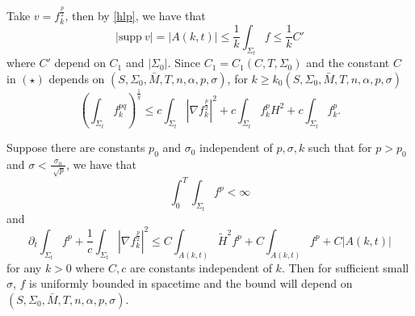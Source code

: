 Take $v=f_{k}^{\frac{p}{2}} $, then by \autoref{hlp}, we have that 
\[\left| \mathrm{supp}  \  v \right|=\left| A(k,t) \right| \leq \frac{1}{k} \int_{\Sigma_t} f \leq \frac{1}{k} C'  \]
where $C'$ depend on $C_1$ and $\left| \Sigma_0 \right| $. Since $C_1=C_1(C,T,\Sigma _0)$ and the constant $C$ in $(\star )$ depends on $(S,\Sigma _0,\bar{M},T,n,\alpha ,p,\sigma )$, for $k \geq k_0(S,\Sigma _0,\bar{M},T,n,\alpha ,p,\sigma ) $
\begin{equation} \label{MSF}
    \left(\int_{\Sigma_t} f_{k}^{pq} \right) ^{\frac{1}{q}} \leq c \int_{\Sigma_t} \left| \nabla f_{k}^{\frac{p}{2}} \right| ^2 + c \int_{\Sigma_t} f_{k}^{p} H^2 + c \int_{\Sigma_t} f_{k}^{p}.
\end{equation}

\begin{theorem}
    Suppose there are constants $p_0$ and $\sigma _0$ independent of $p, \sigma , k$ such that for $p>p_0$ and $\sigma < \frac{\sigma _0}{\sqrt[]{p}}$, we have that 
    \[\int_{0}^{T}\int_{\Sigma_t} f^p < \infty \]
    and
    \begin{equation} \label{ELEFP}
        \partial _t \int_{\Sigma_t} f^p + \frac{1}{c} \int_{\Sigma_t} \left| \nabla f_{k}^{\frac{p}{2}}  \right| ^2 \leq C \int_{A(k,t)}^{} \tilde{H}^2 f^p +C \int_{A(k,t)}^{}f^p + C \left| A(k,t) \right| 
    \end{equation}
    for any $k>0$ where $C,c$ are constants independent of $k$.
    Then for sufficient small $\sigma $, $f$ is uniformly bounded in spacetime and the bound will depend on $(S,\Sigma _0,\bar{M},T,n,\alpha ,p,\sigma )$.
\end{theorem}

